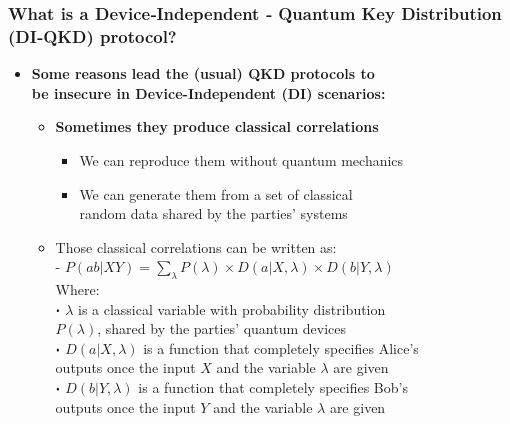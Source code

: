 \documentclass{beamer}
\newcommand\sbullet[1][.5]{\mathbin{\vcenter{\hbox{\scalebox{#1}{$\bullet$}}}}}
\begin{document}
    \begin{frame}
        \frametitle{\footnotesize What is a Device‑Independent ‑ Quantum Key Distribution (DI‑QKD) protocol?}

        \vspace{2.5ex}
        \begin{itemize}
            \item \textbf{Some reasons lead the (usual) QKD protocols to\\ be insecure in Device-Independent (DI) scenarios:}
            \begin{itemize}
                \item \textbf{Sometimes they produce classical correlations}
                \begin{itemize}
                    \item We can reproduce them without quantum mechanics
                    \item We can generate them from a set of classical\\ random data shared by the parties' systems
                \end{itemize}
                \vspace{1.5ex}
                \item Those classical correlations can be written as:\\
                - $P(ab|XY) = \sum_{\lambda} P(\lambda) \times D(a|X,\lambda) \times D(b|Y,\lambda)$\\
                \vspace{0.75ex}\scriptsize
                \hspace{1em}Where:\\
                \hspace{0.75em}$\sbullet$ $\lambda$ is a classical variable with probability distribution\\
                \hspace{1.15em}$P(\lambda)$, shared by the parties' quantum devices\\
                \hspace{0.75em}$\sbullet$ $D(a|X,\lambda)$ is a function that completely specifies Alice's\\
                \hspace{1.15em}outputs once the input $X$ and the variable $\lambda$ are given\\
                \hspace{0.75em}$\sbullet$ $D(b|Y,\lambda)$ is a function that completely specifies Bob's\\
                \hspace{1.15em}outputs once the input $Y$ and the variable $\lambda$ are given
            \end{itemize}
        \end{itemize}
    \end{frame}
\end{document}
